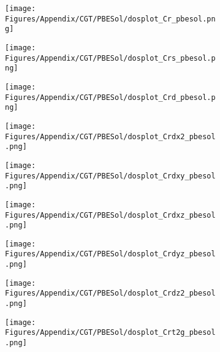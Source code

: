 \newpage
 \begin{figure}[H]
      \centering
    \begin{subfigure}{0.24\textwidth}
    \texttt{[image: Figures/Appendix/CGT/PBESol/dosplot\_Cr\_pbesol.png]}
    \label{dosplot_Cr_pbesol}   
    \end{subfigure}  
    \hfill
\begin{subfigure}{0.24\textwidth}
\centering
    \texttt{[image: Figures/Appendix/CGT/PBESol/dosplot\_Crs\_pbesol.png]}
    \label{dosplot_Crs_pbesol}
\end{subfigure}
\hfill
\begin{subfigure}{0.24\textwidth}
    \texttt{[image: Figures/Appendix/CGT/PBESol/dosplot\_Crd\_pbesol.png]}
    \label{dosplot_Crd_pbesol}
\end{subfigure}
\hfill
\begin{subfigure}{0.24\textwidth}
    \texttt{[image: Figures/Appendix/CGT/PBESol/dosplot\_Crdx2\_pbesol.png]}
    \label{dodosplot_Crdx2_pbesol}
\end{subfigure}
\hfill
\begin{subfigure}{0.24\textwidth}
    \texttt{[image: Figures/Appendix/CGT/PBESol/dosplot\_Crdxy\_pbesol.png]}
    \label{dosplot_Crdxy_pbesol}
\end{subfigure}
\hfill
\begin{subfigure}{0.24\textwidth}
    \texttt{[image: Figures/Appendix/CGT/PBESol/dosplot\_Crdxz\_pbesol.png]}
    \label{dosplot_Crdxz_pbesol}
\end{subfigure}
\hfill
\begin{subfigure}{0.24\textwidth}
    \texttt{[image: Figures/Appendix/CGT/PBESol/dosplot\_Crdyz\_pbesol.png]}
    \label{dosplot_Crdyz_pbesol}
\end{subfigure}
\hfill
\begin{subfigure}{0.24\textwidth}
    \texttt{[image: Figures/Appendix/CGT/PBESol/dosplot\_Crdz2\_pbesol.png]}
    \label{dosplot_Crdz2_pbesol}
\end{subfigure}
\hfill
\begin{subfigure}{0.24\textwidth}
    \texttt{[image: Figures/Appendix/CGT/PBESol/dosplot\_Crt2g\_pbesol.png]}
    \label{dosplot_Crt2g_pbesol}
\end{subfigure}
\hfill
\begin{subfigure}{0.24\textwidth}

\end{subfigure}
\end{figure}
